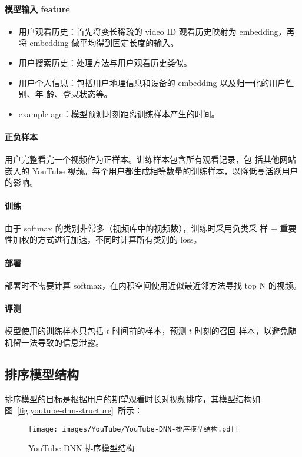 \paragraph{模型输入 feature}
\begin{itemize}
  \item 用户观看历史：首先将变长稀疏的 video ID 观看历史映射为 embedding，再将
    embedding 做平均得到固定长度的输入。
  \item 用户搜索历史：处理方法与用户观看历史类似。
  \item 用户个人信息：包括用户地理信息和设备的 embedding 以及归一化的用户性别、年
    龄、登录状态等。
  \item example age：模型预测时刻距离训练样本产生的时间。
\end{itemize}
\paragraph{正负样本} 用户完整看完一个视频作为正样本。训练样本包含所有观看记录，包
括其他网站嵌入的 YouTube 视频。每个用户都生成相等数量的训练样本，以降低高活跃用户
的影响。
\paragraph{训练} 由于 softmax 的类别非常多（视频库中的视频数），训练时采用负类采
样 + 重要性加权的方式进行加速，不同时计算所有类别的 loss。
\paragraph{部署} 部署时不需要计算 softmax，在内积空间使用近似最近邻方法寻找 top
N 的视频。
\paragraph{评测} 模型使用的训练样本只包括 $t$ 时间前的样本，预测 $t$ 时刻的召回
样本，以避免随机留一法导致的信息泄露。

\subsection{排序模型结构}
排序模型的目标是根据用户的期望观看时长对视频排序，其模型结构如
图~\ref{fig:youtube-dnn-structure}~所示：

\begin{figure}[ht]
  \centering
  \texttt{[image: images/YouTube/YouTube-DNN-排序模型结构.pdf]}
  \caption{YouTube DNN 排序模型结构}\label{fig:youtube-dnn-ranking-structure}
\end{figure}

